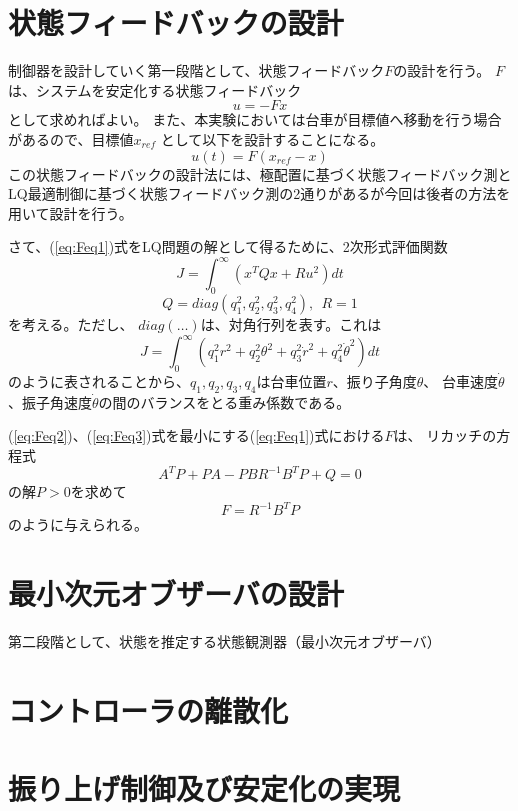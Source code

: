 \section{状態フィードバックの設計}
	制御器を設計していく第一段階として、状態フィードバック$F$の設計を行う。
	$F$は、システムを安定化する状態フィードバック
	\[
		u = -Fx
	\]
	として求めればよい。
	また、本実験においては台車が目標値へ移動を行う場合があるので、目標値$x_{ref}$
	として以下を設計することになる。
	\begin{equation}
		u(t) = F(x_{ref} - x)
		\label{eq:Feq1}
	\end{equation}
	この状態フィードバックの設計法には、極配置に基づく状態フィードバック測と
	LQ最適制御に基づく状態フィードバック測の2通りがあるが今回は後者の方法を用いて設計を行う。
	\par
	さて、(\ref{eq:Feq1})式をLQ問題の解として得るために、2次形式評価関数
	\begin{equation}
		J = \int_{0}^{\infty}(x^{T}Qx+Ru^{2})dt
		\label{eq:Feq2}
	\end{equation}
	\begin{equation}
		Q = diag(q_{1}^2,q_{2}^2,q_{3}^2,q_{4}^2),\ \ R = 1
		\label{eq:Feq3}
	\end{equation}
	を考える。ただし、 $diag(\ldots)$は、対角行列を表す。これは
	\begin{equation}
		J=\int_{0}^{\infty}(q_{1}^{2}r^{2}+q_{2}^{2}\theta^{2}
		+q_{3}^{2}\dot{r}^{2}+q_{4}^{2}\dot{\theta}^{2})dt
	\end{equation}
	のように表されることから、$q_1,q_2,q_3,q_4$は台車位置$r$、振り子角度$\theta$、
	台車速度$\dot{\theta}$、振子角速度$\dot{\theta}$の間のバランスをとる重み係数である。
	\par
	(\ref{eq:Feq2})、(\ref{eq:Feq3})式を最小にする(\ref{eq:Feq1})式における$F$は、
	リカッチの方程式
	\[
		A^{T}P+PA-PBR^{-1}B^{T}P+Q = 0
	\]
	の解$P>0$を求めて
	\[
		F = R^{-1}B^{T}P
	\]
	のように与えられる。

\section{最小次元オブザーバの設計}
	第二段階として、状態を推定する状態観測器（最小次元オブザーバ）
	\begin{equation}
		
	\end{equation}

\section{コントローラの離散化}

\section{振り上げ制御及び安定化の実現}

